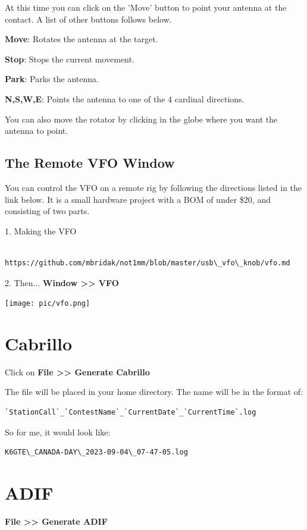 \documentclass{article}
\begin{document}
At this time you can click on the 'Move' button to point your antenna at the contact. A list of other buttons follows below.

\textbf{Move}: Rotates the antenna at the target.

\textbf{Stop}: Stops the current movement.

\textbf{Park}: Parks the antenna.

\textbf{N,S,W,E}: Points the antenna to one of the 4 cardinal directions.

You can also move the rotator by clicking in the globe where you want the antenna to point.



\subsection{The Remote VFO Window}

You can control the VFO on a remote rig by following the directions listed in the link below. It is a small hardware project with a BOM of under \$20, and consisting of two parts.

1. Making the VFO
\begin{verbatim}
    https://github.com/mbridak/not1mm/blob/master/usb\_vfo\_knob/vfo.md
\end{verbatim}

2. Then... \textbf{Window >> VFO}

\vspace{0.5cm}
\texttt{[image: pic/vfo.png]}
\newpage
\section{Cabrillo}

Click on \textbf{File >> Generate Cabrillo}

The file will be placed in your home directory. The name will be in the format of:
\begin{verbatim}
`StationCall`_`ContestName`_`CurrentDate`_`CurrentTime`.log
\end{verbatim}
So for me, it would look like:
\begin{verbatim}
K6GTE\_CANADA-DAY\_2023-09-04\_07-47-05.log
\end{verbatim}

\section{ADIF}

\textbf{File >> Generate ADIF}
\end{document}
